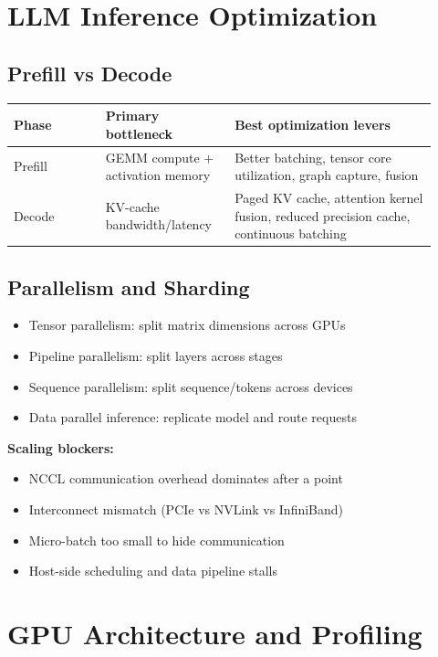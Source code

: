 \documentclass[11pt]{article}
\begin{document}
\section{LLM Inference Optimization}

\subsection{Prefill vs Decode}
\begin{center}
\begin{tabular}{|p{0.2\linewidth}|p{0.28\linewidth}|p{0.44\linewidth}|}
\hline
\textbf{Phase} & \textbf{Primary bottleneck} & \textbf{Best optimization levers} \\
\hline
Prefill & GEMM compute + activation memory & Better batching, tensor core utilization, graph capture, fusion \\
\hline
Decode & KV-cache bandwidth/latency & Paged KV cache, attention kernel fusion, reduced precision cache, continuous batching \\
\hline
\end{tabular}
\end{center}

\subsection{Parallelism and Sharding}
\begin{itemize}[leftmargin=*]
\item Tensor parallelism: split matrix dimensions across GPUs
\item Pipeline parallelism: split layers across stages
\item Sequence parallelism: split sequence/tokens across devices
\item Data parallel inference: replicate model and route requests
\end{itemize}

\textbf{Scaling blockers:}
\begin{itemize}[leftmargin=*]
\item NCCL communication overhead dominates after a point
\item Interconnect mismatch (PCIe vs NVLink vs InfiniBand)
\item Micro-batch too small to hide communication
\item Host-side scheduling and data pipeline stalls
\end{itemize}

\section{GPU Architecture and Profiling}
\end{document}
